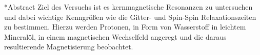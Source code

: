 \documentclass[pdftex, a4paper,11pt, twoside, ngerman]{report}
\begin{document}
  
  
  
  
  
  
  
  
  \begin{chapter}*{Abstract}
    Ziel des Versuchs ist es kernmagnetische Resonanzen zu untersuchen und dabei wichtige Kenngrößen wie die Gitter- und Spin-Spin Relaxationszeiten zu bestimmen.
    Hierzu werden Protonen, in Form von Wasserstoff in leichtem Mineralöl, in einem magnetischen Wechselfeld angeregt und die daraus resultierende Magnetisierung beobachtet.
    
    
  \end{chapter}
  
  \tableofcontents
  
  
  
\end{document}
